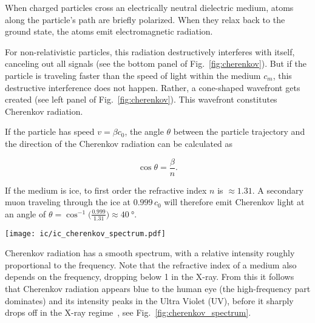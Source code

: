 When charged particles cross an electrically neutral dielectric medium, atoms along the particle's path are briefly polarized. When they relax back to the ground state, the atoms emit electromagnetic radiation.

For non-relativistic particles, this radiation destructively interferes with itself, canceling out all signals (see the bottom panel of Fig.~\ref{fig:cherenkov}). But if the particle is traveling faster than the speed of light within the medium $c_m$, this destructive interference does not happen. Rather, a cone-shaped wavefront gets created (see left panel of Fig.~\ref{fig:cherenkov}). This wavefront constitutes Cherenkov radiation.

If the particle has speed $v=\beta c_0$, the angle $\theta$ between the particle trajectory and the direction of the Cherenkov radiation can be calculated as~

\begin{equation}
    \cos{\theta} = \frac{\beta}{n}.
\end{equation}

If the medium is ice, to first order the refractive index $n$ is $\approx1.31$. A secondary muon traveling through the ice at $0.999\,c_0$ will therefore emit Cherenkov light at an angle of $\theta = \cos^{-1}{\big(\frac{0.999}{1.31}\big)} \approx \SI{40}{\degree}$.
\begin{marginfigure}
    \texttt{[image: ic/ic\_cherenkov\_spectrum.pdf]}
    \caption[Cherenkov spectrum]{Cherenkov spectrum for a particle with $v=0.8 \,c_0$ in water. The intensity peaks around $\SI{4e15}{\Hz}$, corresponding to a wavelength of \SI{75}{\nm}, lying at the high-frequency end of the UV spectrum. Adapted from~\cite{Fulop1992}.}
\end{marginfigure}
Cherenkov radiation has a smooth spectrum, with a relative intensity roughly proportional to the frequency. Note that the refractive index of a medium also depends on the frequency, dropping below 1 in the X-ray. From this it follows that Cherenkov radiation appears blue to the human eye (the high-frequency part dominates) and its intensity peaks in the Ultra Violet (UV), before it sharply drops off in the X-ray regime~, see Fig.~\ref{fig:cherenkov_spectrum}.

